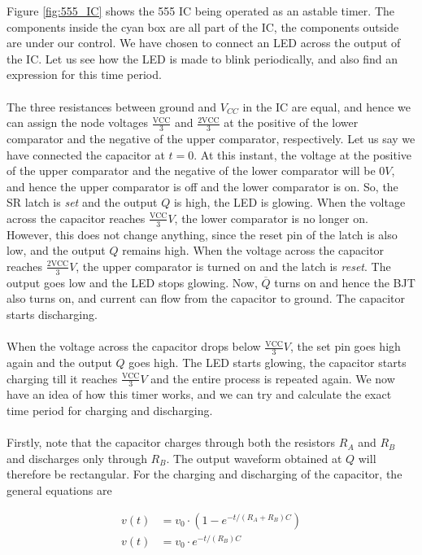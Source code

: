 \documentclass[11pt]{article}
\numberwithin{equation}{section}
\begin{document}
\begin{flushleft}
Figure \ref{fig:555_IC} shows the 555 IC being operated as an astable timer. The components inside the cyan box are all part of the IC, the
components outside are under our control. We have chosen to connect an LED across the output of the IC. Let us see how the LED is made to blink
periodically, and also find an expression for this time period. \\~\\
The three resistances between ground and $V_{CC}$ in the IC are equal, and hence we can assign the node voltages $\frac{\text{VCC}}{3}$ and 
$\frac{2\text{VCC}}{3}$ at the positive of the lower comparator and the negative of the upper comparator, respectively. Let us say we have
connected the capacitor at $t=0$. At this instant, the voltage at the positive of the upper comparator and the negative of the lower comparator
will be $0V$, and hence the upper comparator is off and the lower comparator is on. So, the SR latch is \textit{set} and the output $Q$ is high, 
the LED is glowing. When the voltage across the capacitor reaches $\frac{\text{VCC}}{3}V$, the lower comparator is no longer on. However, this
does not change anything, since the reset pin of the latch is also low, and the output $Q$ remains high. When the voltage across the capacitor
reaches $\frac{2\text{VCC}}{3}V$, the upper comparator is turned on and the latch is \textit{reset}. The output goes low and the LED stops
glowing. Now, $\overline{Q}$ turns on and hence the BJT also turns on, and current can flow from the capacitor to ground. The capacitor starts
discharging. \\~\\
When the voltage across the capacitor drops below $\frac{\text{VCC}}{3}V$, the set pin goes high again and the output $Q$ goes high. The LED starts
glowing, the capacitor starts charging till it reaches $\frac{\text{VCC}}{3}V$ and the entire process is repeated again. We now have an idea of
how this timer works, and we can try and calculate the exact time period for charging and discharging.\\~\\

Firstly, note that the capacitor charges through both the resistors $R_A$ and $R_B$ and discharges only through $R_B$. The output waveform
obtained at $Q$ will therefore be rectangular. For the charging and discharging of the capacitor, the general equations are

\begin{align*}
v(t) &= v_0\cdot (1-e^{-t/(R_A+R_B)C})\\
v(t) &= v_0\cdot e^{-t/(R_B)C}
\end{align*}


\end{flushleft}
\end{document}
